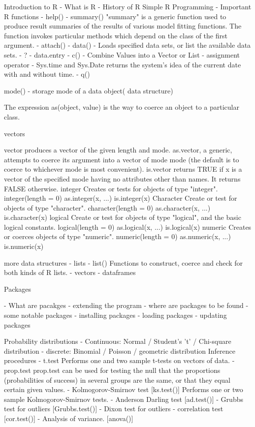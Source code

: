 \documentclass[a4paper,12pt]{article}
\begin{document}
Introduction to R
 - What is R
 - History of R
Simple R Programming
 - Important R functions
  - help()
  - summary()
"summary" is a generic function used to produce result summaries of the results of various model fitting functions. 
The function invokes particular methods which depend on the class of the first argument. 
  - attach()
  - data()
   - Loads specified data sets, or list the available data sets. 
  - ?
  - data.entry
  - c()
- Combine Values into a Vector or List
  - assignment operator
  - Sys.time and Sys.Date returns the system's idea of the current date with and without time. 
  - q()


mode() - storage mode of a data object( data structure)

The expression as(object, value) is the way to coerce an object to a particular class. 

vectors

vector produces a vector of the given length and mode.
as.vector, a generic, attempts to coerce its argument into a vector of mode mode (the default is to coerce to whichever mode is most convenient).
is.vector returns TRUE if x is a vector of the specified mode having no attributes other than names. It returns FALSE otherwise.  
integer
Creates or tests for objects of type "integer".
integer(length = 0)
as.integer(x, ...)
is.integer(x)
 Character
Create or test for objects of type "character".
character(length = 0)
as.character(x, ...)
is.character(x)
logical
Create or test for objects of type "logical", and the basic logical constants.
logical(length = 0)
as.logical(x, ...)
is.logical(x)
numeric
Creates or coerces objects of type "numeric". 
numeric(length = 0)
as.numeric(x, ...)
is.numeric(x)



more data structures
 - lists
   - list() Functions to construct, coerce and check for both kinds of R lists. 
 - vectors
 - dataframes
 
Packages

 - What are pacakges
- extending the program
 - where are packages to be found
 - some notable packages
 - installing packages
 - loading packages
 - updating packages
 
Probability distributions
 - Continuous: Normal / Student's 't' / Chi-square distribution
 - discrete: Binomial / Poisson / geometric distribution
Inference procedures
 - t.test
Performs one and two sample t-tests on vectors of data. 
 - prop.test
	    prop.test can be used for testing the null that the proportions (probabilities of success) in several groups are the same, or that they equal certain given values.
 - Kolmogorov-Smirnov test      [ks.test()]
Performs one or two sample Kolmogorov-Smirnov tests. 
 - Anderson Darling test        [ad.test()]
 - Grubbs test for outliers     [Grubbs.test()]
 - Dixon test for outliers
 - correlation test [cor.test()]
 - Analysis of variance. [anova()]
 
\end{document}

